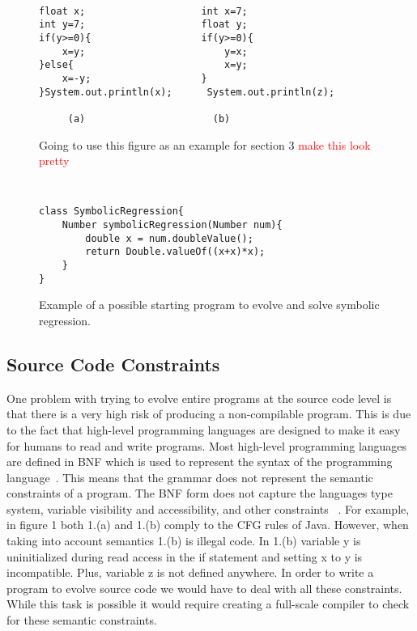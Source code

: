 \documentclass{sig-alternate}
\newcommand{\mycomment}[1]{\textcolor{red}{#1}}
\begin{document}
\begin{figure}
\centering
{\tt
\begin{verbatim}
float x;                    int x=7;
int y=7;                    float y;
if(y>=0){                   if(y>=0){
    x=y;                        y=x;
}else{                          x=y;
    x=-y;                   }
}System.out.println(x);      System.out.println(z);	
     
     (a)                      (b)

\end{verbatim}
}
\caption{Going to use this figure as an example for section 3 \mycomment{make this look pretty}}
\end{figure}


\begin{figure}
\centering
{\tt
\begin{verbatim}
class SymbolicRegression{
    Number symbolicRegression(Number num){
        double x = num.doubleValue();
        return Double.valueOf((x+x)*x);
    }
}

\end{verbatim}
}
\caption{Example of a possible starting program to evolve and solve symbolic regression.}
\end{figure}


\subsection{Source Code Constraints}
One problem with trying to evolve entire programs at the source code level is that there is a very high risk of producing a non-compilable program. This is due to the fact that high-level programming languages are designed to make it easy for humans to read and write programs. Most high-level programming languages are defined in BNF which is used to represent the syntax of the programming language~\cite{Oracle:2013,Assembly:2010}. This means that the grammar does not represent the semantic constraints of a program. The BNF form does not capture the languages type system, variable visibility and accessibility, and other constraints ~\cite{FINCH:2011}. For example, in figure 1 both 1.(a) and 1.(b) comply to the CFG rules of Java. However, when taking into account semantics 1.(b) is illegal code. In 1.(b) variable y is uninitialized during read access in the if statement and setting x to y is incompatible. Plus, variable z is not defined anywhere.  In order to write a program to evolve source code we would have to deal with all these constraints. While this task is possible it would require creating a full-scale compiler to check for these semantic constraints. \par
\end{document}
